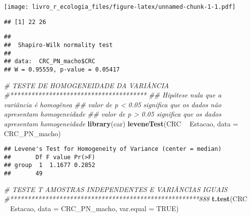 \documentclass[
]{book}
\newenvironment{Shaded}{\begin{snugshade}}{\end{snugshade}}
\newcommand{\CommentTok}[1]{\textcolor[rgb]{0.56,0.35,0.01}{\textit{#1}}}
\newcommand{\DataTypeTok}[1]{\textcolor[rgb]{0.13,0.29,0.53}{#1}}
\newcommand{\KeywordTok}[1]{\textcolor[rgb]{0.13,0.29,0.53}{\textbf{#1}}}
\newcommand{\NormalTok}[1]{#1}
\newcommand{\OperatorTok}[1]{\textcolor[rgb]{0.81,0.36,0.00}{\textbf{#1}}}
\newcommand{\OtherTok}[1]{\textcolor[rgb]{0.56,0.35,0.01}{#1}}
\newcommand{\StringTok}[1]{\textcolor[rgb]{0.31,0.60,0.02}{#1}}
\begin{document}
\texttt{[image: livro\_r\_ecologia\_files/figure-latex/unnamed-chunk-1-1.pdf]}

\begin{verbatim}
## [1] 22 26
\end{verbatim}

\begin{Shaded}
\end{Shaded}

\begin{verbatim}
## 
## 	Shapiro-Wilk normality test
## 
## data:  CRC_PN_macho$CRC
## W = 0.95559, p-value = 0.05417
\end{verbatim}

\begin{Shaded}
\begin{Highlighting}[]
\CommentTok{# TESTE DE HOMOGENEIDADE DA VARIÂNCIA}
\CommentTok{#***************************************}
\CommentTok{## Hipótese nula que a variância é homogênea}
\CommentTok{## valor de p < 0.05 significa que os dados não apresentam homogeneidade}
\CommentTok{## valor de p > 0.05 significa que os dados apresentam homogeneidade}
\KeywordTok{library}\NormalTok{(car)}
\KeywordTok{leveneTest}\NormalTok{(CRC }\OperatorTok{~}\StringTok{ }\NormalTok{Estacao, }\DataTypeTok{data =}\NormalTok{ CRC_PN_macho)}
\end{Highlighting}
\end{Shaded}

\begin{verbatim}
## Levene's Test for Homogeneity of Variance (center = median)
##       Df F value Pr(>F)
## group  1  1.1677 0.2852
##       49
\end{verbatim}

\begin{Shaded}
\begin{Highlighting}[]
\CommentTok{# TESTE T AMOSTRAS INDEPENDENTES E VARIÂNCIAS IGUAIS}
\CommentTok{#******************************************************888}
\KeywordTok{t.test}\NormalTok{(CRC }\OperatorTok{~}\StringTok{ }\NormalTok{Estacao, }\DataTypeTok{data =}\NormalTok{ CRC_PN_macho, }\DataTypeTok{var.equal =} \OtherTok{TRUE}\NormalTok{)}
\end{Highlighting}
\end{Shaded}
\end{document}
